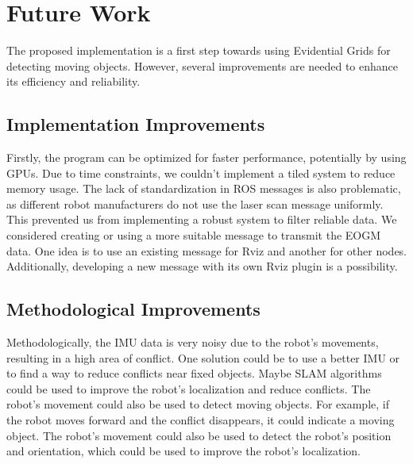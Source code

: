 \section{Future Work}

The proposed implementation is a first step towards using Evidential Grids for detecting moving objects. However, several improvements are needed to enhance its efficiency and reliability.

\subsection{Implementation Improvements}

Firstly, the program can be optimized for faster performance, potentially by using GPUs. Due to time constraints, we couldn't implement a tiled system to reduce memory usage. The lack of standardization in ROS messages is also problematic, as different robot manufacturers do not use the laser scan message uniformly. This prevented us from implementing a robust system to filter reliable data. We considered creating or using a more suitable message to transmit the EOGM data. One idea is to use an existing message for Rviz and another for other nodes. Additionally, developing a new message with its own Rviz plugin is a possibility.

\subsection{Methodological Improvements}

Methodologically, the IMU data is very noisy due to the robot's movements, resulting in a high area of conflict. One solution could be to use a better IMU or to find a way to reduce conflicts near fixed objects.
Maybe SLAM algorithms could be used to improve the robot's localization and reduce conflicts. The robot's movement could also be used to detect moving objects. For example, if the robot moves forward and the conflict disappears, it could indicate a moving object. The robot's movement could also be used to detect the robot's position and orientation, which could be used to improve the robot's localization.
